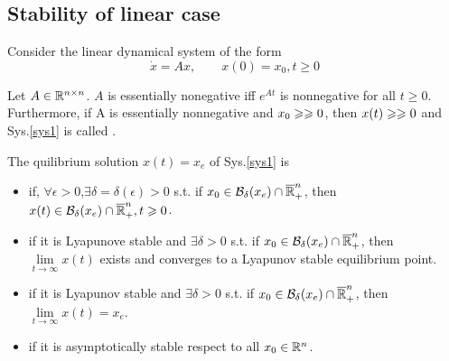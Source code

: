 \documentclass{paper}
\begin{document}
\subsection{Stability of linear case}
Consider the linear dynamical system of the form
\begin{equation}\label{sys1}
\dot{x}=Ax,\qquad x(0)=x_0, t\geqslant 0
\end{equation}
\begin{lem}\label{lem2}
Let $A\in \mathbb{R}^{n\times n}$. $A$ is essentially nonegative iff $e^{At}$ is nonnegative for all $t\geqslant 0$.
Furthermore, if A is essentially nonnegative and $x_0\geqslant\geqslant 0$, then $x(t)\geqslant\geqslant 0$ and Sys.\ref{sys1} is
called .
\end{lem}
\begin{defi}
The quilibrium solution $x(t)=x_e$ of Sys.\ref{sys1} is 
\begin{itemize}
\item {} if, $\forall\epsilon>0$,$\exists \delta=\delta(\epsilon)>0$ s.t. if $x_0\in 
\mathcal{B}_{\delta}(x_e) \cap \overline{\mathbb{R}}_{+}^{n}$, then $x(t) \in \mathcal{B}_{\delta}(x_e) \cap \overline{\mathbb{R}}_{+}^{n}, t\geqslant 0$.
\item {} if it is Lyapunove stable and $\exists \delta>0$ s.t. if $x_0\in \mathcal{B}_{\delta}(x_e) \cap \overline{\mathbb{R}}_{+}^{n}$,
then $\lim\limits_{t\rightarrow\infty}x(t)$ exists and converges to a Lyapunov stable equilibrium point.
\item {} if it is Lyapunov stable and $\exists \delta>0$ s.t. if $x_0\in \mathcal{B}_{\delta}(x_e) \cap
\overline{\mathbb{R}}_{+}^{n}$, then $\lim\limits_{t\rightarrow\infty}x(t)=x_e$.
\item {} if it is asymptotically stable respect to all $x_0\in\mathbb{R}^{n}$.
\end{itemize}
\end{defi}
\end{document}
